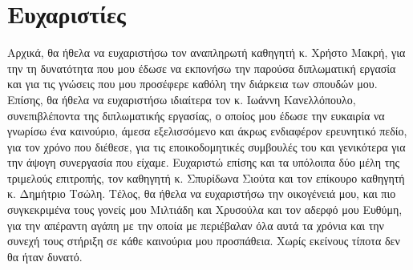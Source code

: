 \chapter*{Ευχαριστίες}
\noindent Αρχικά, θα ήθελα να ευχαριστήσω τον αναπληρωτή καθηγητή κ. Χρήστο Μακρή, για την τη δυνατότητα που μου έδωσε να εκπονήσω την παρούσα διπλωματική εργασία και για τις γνώσεις που μου προσέφερε καθόλη την διάρκεια των σπουδών μου. Επίσης, θα ήθελα να ευχαριστήσω ιδιαίτερα τον κ. Ιωάννη Κανελλόπουλο, συνεπιβλέποντα της διπλωματικής εργασίας, ο οποίος μου έδωσε την ευκαιρία να γνωρίσω ένα καινούριο, άμεσα εξελισσόμενο και άκρως ενδιαφέρον ερευνητικό πεδίο, για τον χρόνο που διέθεσε, για τις εποικοδομητικές συμβουλές του και γενικότερα για την άψογη συνεργασία που είχαμε. Ευχαριστώ επίσης και τα υπόλοιπα δύο μέλη της τριμελούς επιτροπής, τον καθηγητή κ. Σπυρίδωνα Σιούτα και τον επίκουρο καθηγητή κ. Δημήτριο Τσώλη. Τέλος, θα ήθελα να ευχαριστήσω την οικογένειά μου, και πιο συγκεκριμένα τους γονείς μου Μιλτιάδη και Χρυσούλα και τον αδερφό μου Ευθύμη, για την απέραντη αγάπη με την οποία με περιέβαλαν όλα αυτά τα χρόνια και την συνεχή τους στήριξη σε κάθε καινούρια μου προσπάθεια. Χωρίς εκείνους τίποτα δεν θα ήταν δυνατό.